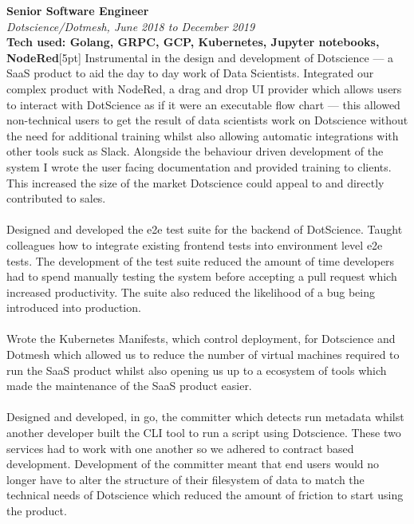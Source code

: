 \documentclass{article}
\begin{document}
\begin{flushleft}
\textbf{Senior Software Engineer}\\
\textit{Dotscience/Dotmesh, June 2018 to December 2019}\\
\textbf{Tech used: Golang, GRPC, GCP, Kubernetes, Jupyter notebooks, NodeRed}[5pt]
Instrumental in the design and development of Dotscience — a SaaS product to aid the day to day work of Data Scientists. Integrated our complex product with NodeRed, a drag and drop UI provider which allows users to interact with DotScience as if it were an executable flow chart — this allowed non-technical users to get the result of data scientists work on Dotscience without the need for additional training whilst also allowing automatic integrations with other tools suck as Slack. Alongside the behaviour driven development of the system I wrote the user facing documentation and provided training to clients. This increased the size of the market Dotscience could appeal to and directly contributed to sales.

\paragraph{}Designed and developed the e2e test suite for the backend of DotScience. Taught colleagues how to integrate existing frontend tests into environment level e2e tests. The development of the test suite reduced the amount of time developers had to spend manually testing the system before accepting a pull request which increased productivity. The suite also reduced the likelihood of a bug being introduced into production. 

\paragraph{}Wrote the Kubernetes Manifests, which control deployment, for Dotscience and Dotmesh which allowed us to reduce the number of virtual machines required to run the SaaS product whilst also opening us up to a ecosystem of tools which made the maintenance of the SaaS product easier.

\paragraph{}Designed and developed, in go, the committer which detects run metadata whilst another developer built the CLI tool to run a script using Dotscience. These two services had to work with one another so we adhered to contract based development. Development of the committer meant that end users would no longer have to alter the structure of their filesystem of data to match the technical needs of Dotscience which reduced the amount of friction to start using the product.\\[10pt]


\end{flushleft}
\end{document}
